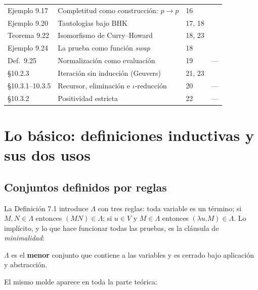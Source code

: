 \documentclass[11pt,a4paper]{article}
\newcommand{\etiqueta}[2]{\tcbox[on line, boxsep=0pt, left=3pt, right=3pt,
  top=1pt, bottom=1pt, colback=#1!12, colframe=#1, boxrule=0.4pt,
  arc=2pt]{\sffamily\scriptsize #2}}
\newcommand{\dem}{\etiqueta{okverde}{demostrado}}
\newcommand{\cit}{\etiqueta{cita}{citado}}
\begin{document}
{\begin{longtable}{@{}p{}p{}p{}p{}@{}}
Ejemplo 9.17 & Completitud como construcción: \(p\to p\) & 16 & \dem\\
Ejemplo 9.20 & Tautologías bajo BHK & 17, 18 & \dem\\
Teorema 9.22 & Isomorfismo de Curry--Howard & 18, 23 & \cit\\
Ejemplo 9.24 & La prueba como función \emph{swap} & 18 & \dem\\
Def.~9.25 & Normalización como evaluación & 19 & ---\\
§10.2.3 & Iteración sin inducción (Geuvers) & 21, 23 & \cit\\
§10.3.1--10.3.5 & Recursor, eliminación e \(\iota\)-reducción & 20 & ---\\
§10.3.2 & Positividad estricta & 22 & ---\\
\bottomrule
\end{longtable}
}

\section{Lo básico: definiciones inductivas y sus dos usos}

\subsection{Conjuntos definidos por reglas}

La Definición 7.1 introduce \(\Lambda\) con tres reglas: toda variable es un
término; si \(M,N\in\Lambda\) entonces \((MN)\in\Lambda\); si \(u\in V\) y
\(M\in\Lambda\) entonces \((\lambda u.M)\in\Lambda\). Lo implícito, y lo que
hace funcionar todas las pruebas, es la cláusula de \emph{minimalidad}:

\begin{center}
\(\Lambda\) es el \textbf{menor} conjunto que contiene a las variables y es cerrado bajo
aplicación y abstracción.
\end{center}

El mismo molde aparece en toda la parte teórica:
\end{document}
